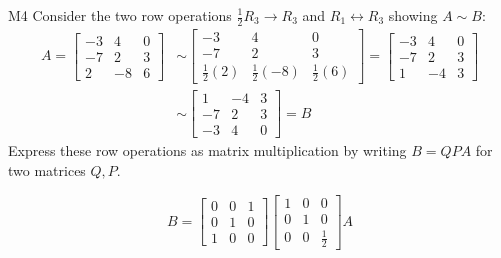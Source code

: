 \begin{problem}{M4}
Consider the two row operations 
\(\frac{1}{2} R_3\to R_3\) and \(R_1\leftrightarrow R_3\)
showing \(A\sim B\):
\begin{align*}
A
  =
\begin{bmatrix}
-3&4&0\\
-7&2&3\\
2&-8&6
\end{bmatrix}
  &\sim
\begin{bmatrix}
-3&4&0\\
-7&2&3\\
\frac{1}{2}(2)&\frac{1}{2}(-8)&\frac{1}{2}(6)
\end{bmatrix}
  =
\begin{bmatrix}
-3&4&0\\
-7&2&3\\
1&-4&3
\end{bmatrix}
  \\&\sim
\begin{bmatrix}
1&-4&3\\
-7&2&3\\
-3&4&0
\end{bmatrix}
  =
B
\end{align*}
Express these row operations as matrix multiplication
by writing \(B=QPA\) for two matrices \(Q,P\).
\end{problem}
\begin{solution}
\[
B
  =
\begin{bmatrix}
  0&0&1\\
  0&1&0\\
  1&0&0
\end{bmatrix}
\begin{bmatrix}
  1&0&0\\
  0&1&0\\
  0&0&\frac{1}{2}
\end{bmatrix}
A
\]
\end{solution}
